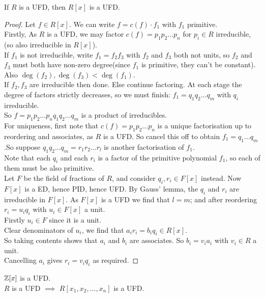 \documentclass[a4paper]{article}
\begin{document}
\begin{thm}
If $R$ is a UFD, then $R[x]$ is a UFD.
\begin{proof}
Let $f\in R[x]$. We can write $f=c\left(f\right)\cdot f_1$ with $f_1$ primitive.\\
Firstly, As $R$ is a UFD, we may factor $c\left(f\right)=p_1 p_2 ... p_n$ for $p_i \in R$ irreducible, (so also irreducible in $R[x]$).\\
If $f_1$ is not irreducible, write $f_1 = f_2 f_3$ with $f_2$ and $f_3$ both not units, so $f_2$ and $f_3$ must both have non-zero degree(since $f_1$ is primitive, they can't be constant). Also $\deg\left(f_2\right),\deg\left(f_3\right) < \deg\left(f_1\right)$.\\
If $f_2,f_3$ are irreducible then done. Else continue factoring. At each stage the degree of factors strictly decreases, so we must finish: $f_1 = q_1 q_2 ... q_m$ with $q_i$ irreducible.\\
So $f=p_1 p_2 ... p_n q_1 q_2 ... q_m$ is a product of irreducibles.\\
For uniqueness, first note that $c\left(f\right)=p_1 p_2 ... p_n$ is a unique factorisation up to reordering and associates, as $R$ is a UFD. So cancel this off to obtain $f_1 = q_1 ... q_m$.So suppose $q_1 q_2 ... q_m = r_1 r_2 ... r_l$ is another factorisation of $f_1$.\\
Note that each $q_i$ and each $r_i$ is a factor of the primitive polynomial $f_1$, so each of them must be also primitive.\\
Let $F$ be the field of fractions of $R$, and consider $q_i, r_i \in F[x]$ instead. Now $F[x]$ is a ED, hence PID, hence UFD. By Gauss' lemma, the $q_i$ and $r_i$ are irreducible in $F[x]$. As $F[x]$ is a UFD we find that $l=m$; and after reordering $r_i = u_i q_i$ with $u_i \in F[x]$ a unit.\\
Firstly $u_i\in F$ since it is a unit.\\
Clear denominators of $u_i$, we find that $a_i r_i = b_i q_i \in R[x]$.\\
So taking contents shows that $a_i$ and $b_i$ are associates. So $b_i = v_i a_i$ with $v_i\in R$ a unit.\\
Cancelling $a_i$ gives $r_i = v_i q_i$ as required.
\end{proof}
\end{thm}

\begin{eg}
$\mathbb{Z}[x]$ is a UFD.\\
$R$ is a UFD $\implies$ $R[x_1,x_2,...,x_n]$ is a UFD.
\end{eg}
\end{document}

